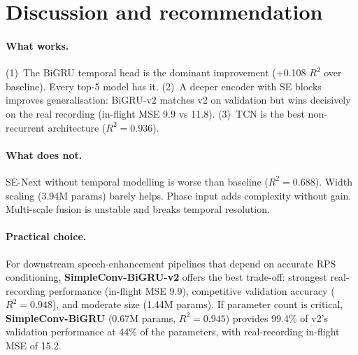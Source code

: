 \documentclass[11pt,a4paper]{article}
\newcommand{\rps}{\ensuremath{\mathrm{RPS}}}
\newcommand{\rsq}{\ensuremath{R^{2}}}
\begin{document}
\section{Discussion and recommendation}

\paragraph{What works.}
(1)~The BiGRU temporal head is the dominant improvement (+0.108 $\rsq$ over baseline). Every top-5 model has it. (2)~A deeper encoder with SE blocks improves generalisation: BiGRU-v2 matches v2 on validation but wins decisively on the real recording (in-flight MSE 9.9 vs 11.8). (3)~TCN is the best non-recurrent architecture ($\rsq = 0.936$).

\paragraph{What does not.}
SE-Next without temporal modelling is worse than baseline ($\rsq = 0.688$). Width scaling (3.94M params) barely helps. Phase input adds complexity without gain. Multi-scale fusion is unstable and breaks temporal resolution.

\paragraph{Practical choice.}
For downstream speech-enhancement pipelines that depend on accurate \rps{} conditioning, \textbf{SimpleConv-BiGRU-v2} offers the best trade-off: strongest real-recording performance (in-flight MSE 9.9), competitive validation accuracy ($\rsq = 0.948$), and moderate size (1.44M params). If parameter count is critical, \textbf{SimpleConv-BiGRU} (0.67M params, $\rsq = 0.945$) provides 99.4\% of v2's validation performance at 44\% of the parameters, with real-recording in-flight MSE of 15.2.
\end{document}
